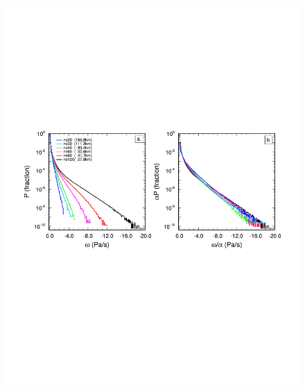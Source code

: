 {\begin{figure}[t]
\begin{center}
\noindent\includegraphics[width=33pc,angle=0]{chapter6/temp_2pdf.pdf}\\
\end{center}
\caption{}
\label{fig:2pdf}
\end{figure}

}
